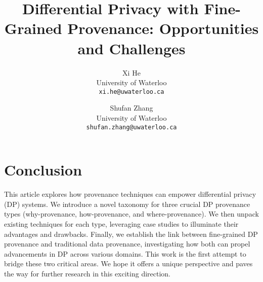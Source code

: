 \documentclass[11pt,dvipdfm]{article}
\begin{document}
\title{Differential Privacy with Fine-Grained Provenance: Opportunities and Challenges}

\author{
  Xi He\\
    University of Waterloo\\
      \texttt{xi.he@uwaterloo.ca}
  \and
        Shufan Zhang\\
  University of Waterloo\\    \texttt{shufan.zhang@uwaterloo.ca}
}




\maketitle













\section{Conclusion}
This article explores how provenance techniques can empower differential privacy (DP) systems. We introduce a novel taxonomy for three crucial DP provenance types (why-provenance, how-provenance, and where-provenance).  We then unpack existing techniques for each type, leveraging case studies to illuminate their advantages and drawbacks. Finally, we establish the link between fine-grained DP provenance and traditional data provenance, investigating how both can propel advancements in DP across various domains. This work is the first attempt to bridge these two critical areas. We hope it offers a unique perspective and paves the way for further research in this exciting direction.


\end{document}
